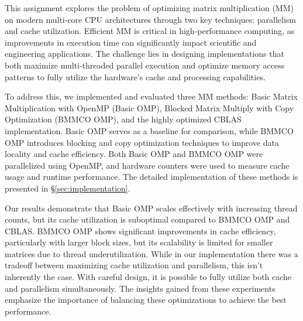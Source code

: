 




This assignment explores the problem of optimizing matrix multiplication (MM) on modern multi-core CPU architectures through two key techniques: parallelism and cache utilization. Efficient MM is critical in high-performance computing, as improvements in execution time can significantly impact scientific and engineering applications. The challenge lies in designing implementations that both maximize multi-threaded parallel execution and optimize memory access patterns to fully utilize the hardware's cache and processing capabilities.

To address this, we implemented and evaluated three MM methods: Basic Matrix Multiplication with OpenMP (Basic OMP), Blocked Matrix Multiply with Copy Optimization (BMMCO OMP), and the highly optimized CBLAS implementation. Basic OMP serves as a baseline for comparison, while BMMCO OMP introduces blocking and copy optimization techniques to improve data locality and cache efficiency. Both Basic OMP and BMMCO OMP were parallelized using OpenMP, and hardware counters were used to measure cache usage and runtime performance. The detailed implementation of these methods is presented in \S\ref{sec:implementation}.

Our results demonstrate that Basic OMP scales effectively with increasing thread counts, but its cache utilization is suboptimal compared to BMMCO OMP and CBLAS. BMMCO OMP shows significant improvements in cache efficiency, particularly with larger block sizes, but its scalability is limited for smaller matrices due to thread underutilization. While in our implementation there was a tradeoff between maximizing cache utilization and parallelism, this isn't inherently the case. With careful design, it is possible to fully utilize both cache and parallelism simultaneously. The insights gained from these experiments emphasize the importance of balancing these optimizations to achieve the best performance.